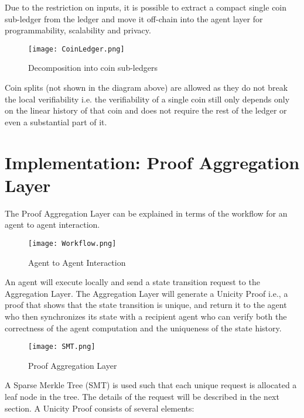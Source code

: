 \documentclass{article}
\begin{document}
Due to the restriction on inputs, it is possible to extract a compact single coin sub-ledger from the ledger and move it off-chain into the agent layer for programmability, scalability and privacy. 
 
\begin{figure}[H]
    \centering
    \texttt{[image: CoinLedger.png]}
    \caption{Decomposition into coin sub-ledgers}
    \label{fig:coinledger}
\end{figure}
\vspace{2mm}

Coin splits (not shown in the diagram above) are allowed as they do not break the local verifiability i.e. the verifiability of a single coin still only depends only on the linear history of that coin and does not require the rest of the ledger or even a substantial part of it.


\section{Implementation: Proof Aggregation Layer}

The Proof Aggregation Layer can be explained in terms of the workflow for an agent to agent interaction. 

\begin{figure}[H]
    \centering
    \texttt{[image: Workflow.png]}
    \caption{Agent to Agent Interaction}
    \label{fig:Workflow}
\end{figure}


An agent will execute locally and send a state transition request to the Aggregation Layer. The Aggregation Layer will generate a Unicity Proof i.e., a proof that shows that the state transition is unique, and return it to the agent who then synchronizes its state with a recipient agent who can verify both the correctness of the agent computation and the uniqueness of the state history.

\vspace{2mm}

\begin{figure}[htbp]
    \centering
    \texttt{[image: SMT.png]}
    \caption{Proof Aggregation Layer}
    \label{fig:SMT}
\end{figure}


A Sparse Merkle Tree (SMT) is used such that each unique request is allocated a leaf node in the tree. The details of the request will be described in the next section. A Unicity Proof consists of several elements:
 
\end{document}
